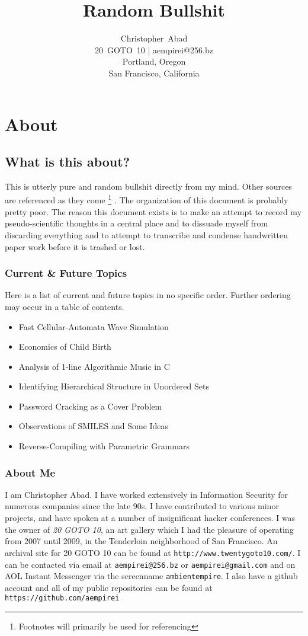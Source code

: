 \documentclass[11pt]{book}
\title{Random Bullshit}
\author{Christopher~Abad \\
20~GOTO~10 | aempirei@256.bz \\
Portland, Oregon \\
San Francisco, California }
\begin{document}
\maketitle

\chapter{About}

\section{What is this about?}

This is utterly pure and random bullshit directly from my mind. Other sources are referenced as they come%
\footnote{Footnotes will primarily be used for referencing}
.  The organization of this document is probably pretty poor. The reason this document exists is to make an attempt to record my pseudo-scientific thoughts in a central place and to dissuade myself from discarding everything and to attempt to transcribe and condense handwritten paper work before it is trashed or lost.

\subsection{Current \& Future Topics}

Here is a list of current and future topics in no specific order. Further ordering may occur in a table of contents.

\begin{itemize}
	\item Fast Cellular-Automata Wave Simulation
	\item Economics of Child Birth
	\item Analysis of 1-line Algorithmic Music in C
	\item Identifying Hierarchical Structure in Unordered Sets
	\item Password Cracking as a Cover Problem
	\item Observations of SMILES and Some Ideas
	\item Reverse-Compiling with Parametric Grammars
\end{itemize}

\subsection{About Me}

I am Christopher Abad. I have worked extensively in Information Security for numerous companies since the late 90s. I have contributed to various minor projects, and have spoken at a number of insignificant hacker conferences. I was the owner of \emph{20 GOTO 10}, an art gallery which I had the pleasure of operating from 2007 until 2009, in the Tenderloin neighborhood of San Francisco. An archival site for 20 GOTO 10 can be found at {\tt http://www.twentygoto10.com/}. I can be contacted via email at {\tt aempirei@256.bz} or {\tt aempirei@gmail.com} and on AOL Instant Messenger via the screenname {\tt ambientempire}. I also have a github account and all of my public repositories can be found at {\tt https://github.com/aempirei}
\end{document}
